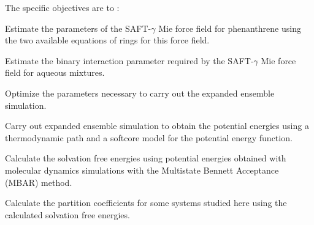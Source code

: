 The specific objectives are to :

\begin{description}[1.5cm]
	\item[$\bullet$] Estimate the parameters of the SAFT-$\gamma$ Mie force field for phenanthrene using the two available equations of rings for this force field. 
	\item[$\bullet$] Estimate the binary interaction parameter required by the SAFT-$\gamma$ Mie force field for aqueous mixtures.
	\item[$\bullet$] Optimize the parameters necessary to carry out the expanded ensemble simulation.
	\item[$\bullet$] Carry out expanded ensemble simulation to obtain the potential energies using  a thermodynamic path and a softcore model for the potential energy function.
	\item[$\bullet$] Calculate the solvation free energies using potential energies obtained with molecular dynamics simulations with the Multistate Bennett Acceptance (MBAR) method.
	\item[$\bullet$] Calculate the partition coefficients for some systems studied here using the calculated solvation free energies.
\end{description}







